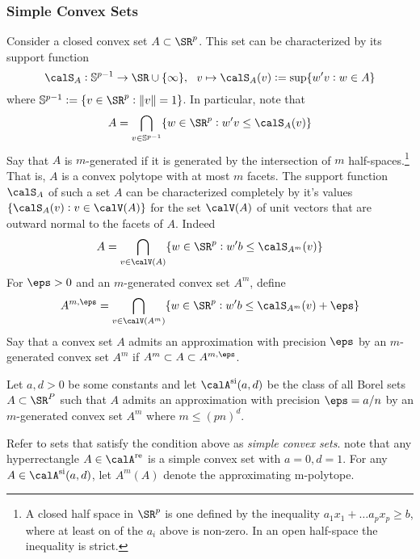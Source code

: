 \subsubsection{Simple Convex Sets}

Consider a closed convex set $A\subset \SR^p$. This set can be characterized by its support function
\[\calS_A: \mathbb{S}^{p-1}\to\SR\cup\{\infty\}, \hbox{ } \hbox{ } v\mapsto \calS_A(v):= \sup\{w'v: w\in A\}\]
where $\mathbb{S}^{p-1}:= \{v\in\SR^p: \|v\| = 1\}$.  In particular, note that \[A = \bigcap_{v\in \mathbb{S}^{p-1}}\{w\in \SR^p: w'v\leq \calS_A(v)\}\]
Say that $A$ is $m$-generated if it is generated by the intersection of $m$ half-spaces.\footnote{A closed half space in $\SR^p$ is one defined by the inequality \(a_1 x_1 + \dots a_p x_p \geq b\), where at least on of the $a_i$ above is non-zero. In an open half-space the inequality is strict.} 
That is, $A$ is a convex polytope with at most $m$ facets. The support function $\calS_A$ of such a set $A$ can be characterized completely by it's values $\{\calS_A(v):v\in \calV(A)\}$ for the set $\calV(A)$ of unit vectors that are outward normal to the facets of $A$. Indeed 
\[A = \bigcap_{v\in\calV(A)} \{w\in\SR^p: w'b\leq \calS_{A^m}(v)\}\]
For $\eps > 0$ and an $m$-generated convex set $A^m$, define 
\[A^{m,\eps} = \bigcap_{v\in\calV(A^m)} \{w\in\SR^p: w'b\leq \calS_{A^m}(v) + \eps\}\]
Say that a convex set $A$ admits an approximation with precision $\eps$ by an $m$-generated convex set $A^m$ if \(A^m \subset A \subset A^{m,\eps}\).

Let $a, d > 0$ be some constants and let $\calA^{\text{si}}(a,d)$ be the class of all Borel sets $A\subset \SR^P$ such that $A$ admits an approximation with precision $\eps = a/n$ by an $m$-generated convex set $A^m$ where $m\leq (pn)^d$.

Refer to sets that satisfy the condition above as \emph{simple convex sets}. note that any hyperrectangle $A\in\calA^{\text{re}}$ is a simple convex set with $a = 0, d = 1$. For any $A \in \calA^{\text{si}}(a,d)$, let $A^m(A)$ denote the approximating m-polytope. 

